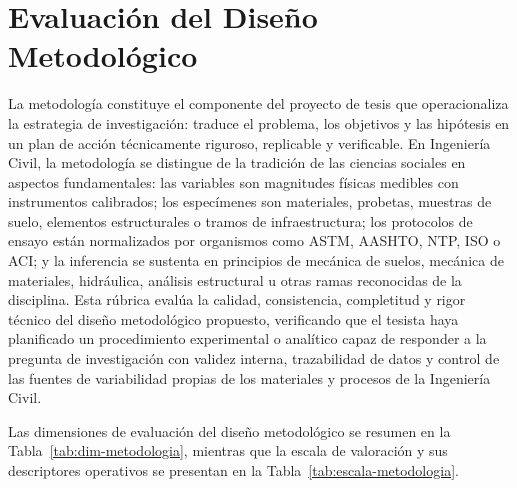\clearpage
\section{Evaluación del Diseño Metodológico}

{\footnotesize
La metodología constituye el componente del proyecto de tesis que operacionaliza la estrategia de investigación: traduce el problema, los objetivos y las hipótesis en un plan de acción técnicamente riguroso, replicable y verificable. En Ingeniería Civil, la metodología se distingue de la tradición de las ciencias sociales en aspectos fundamentales: las variables son magnitudes físicas medibles con instrumentos calibrados; los especímenes son materiales, probetas, muestras de suelo, elementos estructurales o tramos de infraestructura; los protocolos de ensayo están normalizados por organismos como ASTM, AASHTO, NTP, ISO o ACI; y la inferencia se sustenta en principios de mecánica de suelos, mecánica de materiales, hidráulica, análisis estructural u otras ramas reconocidas de la disciplina. Esta rúbrica evalúa la calidad, consistencia, completitud y rigor técnico del diseño metodológico propuesto, verificando que el tesista haya planificado un procedimiento experimental o analítico capaz de responder a la pregunta de investigación con validez interna, trazabilidad de datos y control de las fuentes de variabilidad propias de los materiales y procesos de la Ingeniería Civil.\par
}
Las dimensiones de evaluación del diseño metodológico se resumen en la Tabla~\ref{tab:dim-metodologia}, mientras que la escala de valoración y sus descriptores operativos se presentan en la Tabla~\ref{tab:escala-metodologia}.

